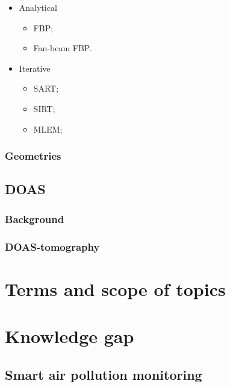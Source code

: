 \begin{itemize}
    \item Analytical
        \begin{itemize}
            \item FBP;
            \item Fan-beam FBP.
        \end{itemize}
    \item Iterative
        \begin{itemize}
            \item SART;
            \item SIRT;
            \item MLEM;
        \end{itemize}
\end{itemize}

\subsubsection{Geometries}%
\label{ssub:geometries}

\subsection{DOAS}%
\label{sub:doas}

\subsubsection{Background}%
\label{ssub:background}

\subsubsection{DOAS-tomography}%
\label{ssub:doas_tomography}

\section{Terms and scope of topics}%
\label{sec:terms_and_scope_of_topics}

\section{Knowledge gap}%
\label{sec:knowledge_gap}

\subsection{Smart air pollution monitoring}%
\label{sub:smart_air_pollution_monitoring}

